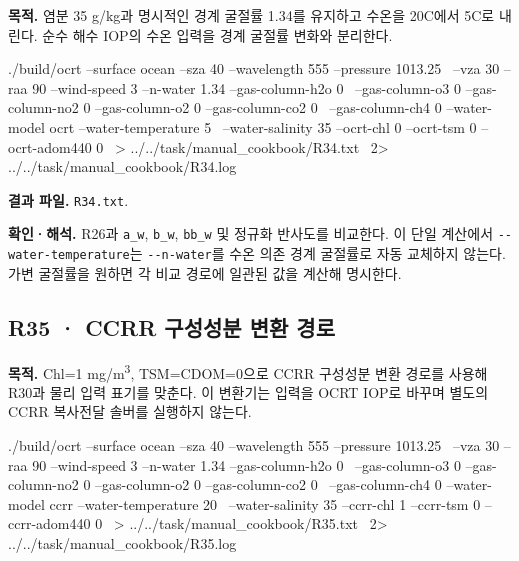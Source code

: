 \label{recipe:R34}

\textbf{목적. }염분 35 g/kg과 명시적인 경계 굴절률 1.34를 유지하고 수온을 20\textdegree{}C에서 5\textdegree{}C로 내린다. 순수 해수 IOP의 수온 입력을 경계 굴절률 변화와 분리한다.

\noindent\begin{minipage}{\linewidth}
\begin{ManualCode}

./build/ocrt --surface ocean --sza 40 --wavelength 555 --pressure 1013.25 \
  --vza 30 --raa 90 --wind-speed 3 --n-water 1.34 --gas-column-h2o 0 \
  --gas-column-o3 0 --gas-column-no2 0 --gas-column-o2 0 --gas-column-co2 0 \
  --gas-column-ch4 0 --water-model ocrt --water-temperature 5 \
  --water-salinity 35 --ocrt-chl 0 --ocrt-tsm 0 --ocrt-adom440 0 \
  > ../../task/manual_cookbook/R34.txt \
  2> ../../task/manual_cookbook/R34.log

\end{ManualCode}
\end{minipage}\par

\textbf{결과 파일. }\texttt{R34.txt}.

\textbf{확인·해석. }R26과 \texttt{a\_\allowbreak{}w}, \texttt{b\_\allowbreak{}w}, \texttt{bb\_\allowbreak{}w} 및 정규화 반사도를 비교한다. 이 단일 계산에서 \texttt{-\allowbreak{}-\allowbreak{}water-\allowbreak{}temperature}는 \texttt{-\allowbreak{}-\allowbreak{}n-\allowbreak{}water}를 수온 의존 경계 굴절률로 자동 교체하지 않는다. 가변 굴절률을 원하면 각 비교 경로에 일관된 값을 계산해 명시한다.


\subsection{R35 · CCRR 구성성분 변환 경로}
\label{sec:auto:09_cookbook:6.10}

\label{recipe:R35}

\textbf{목적. }Chl=1 mg/m\textsuperscript{3}, TSM=CDOM=0으로 CCRR 구성성분 변환 경로를 사용해 R30과 물리 입력 표기를 맞춘다. 이 변환기는 입력을 OCRT IOP로 바꾸며 별도의 CCRR 복사전달 솔버를 실행하지 않는다.

\noindent\begin{minipage}{\linewidth}
\begin{ManualCode}

./build/ocrt --surface ocean --sza 40 --wavelength 555 --pressure 1013.25 \
  --vza 30 --raa 90 --wind-speed 3 --n-water 1.34 --gas-column-h2o 0 \
  --gas-column-o3 0 --gas-column-no2 0 --gas-column-o2 0 --gas-column-co2 0 \
  --gas-column-ch4 0 --water-model ccrr --water-temperature 20 \
  --water-salinity 35 --ccrr-chl 1 --ccrr-tsm 0 --ccrr-adom440 0 \
  > ../../task/manual_cookbook/R35.txt \
  2> ../../task/manual_cookbook/R35.log

\end{ManualCode}
\end{minipage}\par

